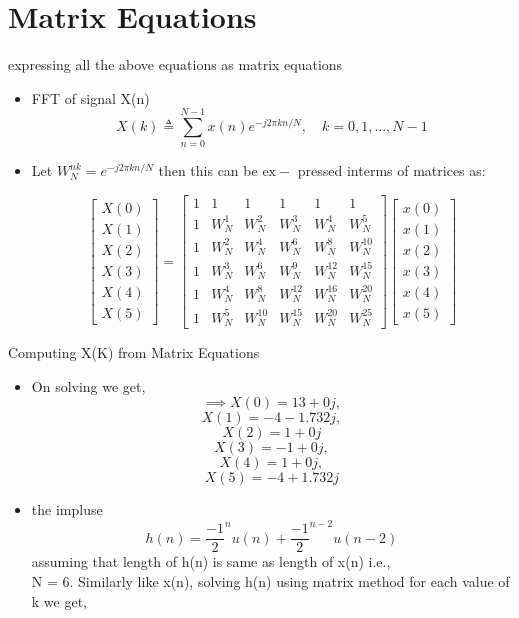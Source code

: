 \documentclass{beamer}
\begin{document}
\section{Matrix Equations}
\begin{frame}{expressing all the above equations as matrix equations}
\begin{itemize}
       \item FFT of signal X(n) 
   \[
        X(k) \triangleq \sum_{n=0}^{N-1} x(n) e^{-j 2 \pi k n / N}, \quad k=0,1, \ldots, N-1
    \]
    \item Let $W_{N}^{n k}=e^{-j 2 \pi k n / N}$ then this can be $\mathrm{ex}-$ pressed interms of matrices as:
    
       \[ \begin{bmatrix} X(0) \\ X(1) \\ X(2) \\ X(3) \\ X(4) \\ X(5) \end{bmatrix}
=
\begin{bmatrix}
1 & 1 & 1 & 1 & 1 & 1 \\ 1 & W_N^1& W_N^2& W_N^3 & W_N^4 & W_N^5\\1 & W_N^2 & W_N^4 & W_N^6 & W_N^8 & W_N^{10}\\1 & W_N^3 & W_N^6 & W_N^9 & W_N^{12} & W_N^{15}\\1 & W_N^4 & W_N^8 & W_N^{12} & W_N^{16} & W_N^{20}\\1 & W_N^5 & W_N^{10} & W_N^{15} & W_N^{20} &W_N^{25}
\end{bmatrix}\begin{bmatrix}
x(0) \\ x(1) \\ x(2) \\ x(3) \\ x(4) \\x(5)
\end{bmatrix}\]
\end{itemize}



\end{frame}
 \begin{frame}{Computing X(K) from Matrix Equations}
  \begin{itemize}
      \item
On solving we get,
\[\implies X(0) = 13 + 0j,\]
\[X(1) = -4 - 1.732j,\]
\[X(2) = 1 + 0j\]
\[X(3) = -1 + 0j,\]
\[X(4) = 1 + 0j,\]
\[X(5) = -4 + 1.732j\]
\item the impluse
\[
 h(n)=\frac{-1}{2}^nu(n) + \frac{-1}{2}^{n-2}u(n-2)
\]
assuming that length of h(n) is same as length of x(n) i.e.,\\ N = 6.
Similarly like x(n), solving h(n) using matrix method for each value of k we get,
  \end{itemize}  
\end{frame}
\end{document}
